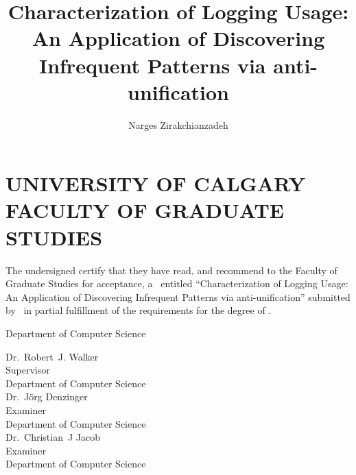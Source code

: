 \documentclass{ucalgthes1}
\title{Characterization of Logging Usage:\\An Application of Discovering Infrequent Patterns via anti-unification}
\author{Narges Zirakchianzadeh}
\theoremstyle{plain}
\theoremstyle{definition}
\newcommand{\thestitle}{Characterization of Logging Usage: An Application of Discovering Infrequent Patterns via anti-unification}
\begin{document}
\makethesistitle
{}     %
\setcounter{page}{1}


\chapter*{UNIVERSITY OF CALGARY \\ FACULTY OF GRADUATE STUDIES}
\thispagestyle{empty}
The undersigned certify that they have read, and recommend
to the Faculty of Graduate Studies for acceptance, a \Thesis\ entitled
``\thestitle'' submitted by \Author\
in partial fulfillment of the requirements for the degree of
\Degree.\\

%
%

\begin{signing}{Department of Computer Science}

\newsigncolumn

\signline
Dr.~Robert~J. Walker \\
Supervisor \\
Department of Computer Science  \\


\signline
Dr.~J{\"o}rg Denzinger \\
Examiner \\
Department of  Computer Science \\

\signline
Dr.~Christian~J Jacob \\
Examiner \\
Department of  Computer Science \\
\end{signing}
\end{document}
